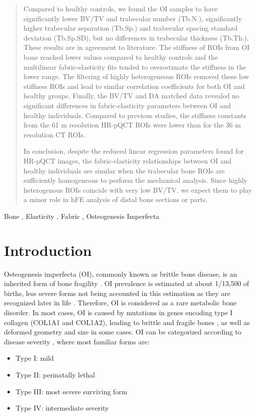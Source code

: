 \documentclass[a4paper,fleqn]{DC_ArtStyle}
\begin{document}
\begin{abstract}
	Compared to healthy controls, we found the OI samples to have significantly lower BV/TV and trabecular number (Tb.N.), significantly higher trabecular separation (Tb.Sp.) and trabecular spacing standard deviation (Tb.Sp.SD), but no differences in trabecular thickness (Tb.Th.). These results are in agreement to literature. The stiffness of ROIs from OI bone reached lower values compared to healthy controls and the multilinear fabric-elasticity fits tended to overestimate the stiffness in the lower range. The filtering of highly heterogeneous ROIs removed these low stiffness ROIs and lead to similar correlation coefficients for both OI and healthy groups. Finally, the BV/TV and DA matched data revealed no significant differences in fabric-elasticity parameters between OI and healthy individuals. Compared to previous studies, the stiffness constants from the 61 \si{\micro}m resolution HR-pQCT ROIs were lower than for the 36 \si{\micro}m resolution \si{\micro}CT ROIs.
	
	In conclusion, despite the reduced linear regression parameters found for HR-pQCT images, the fabric-elasticity relationships between OI and healthy individuals are similar when the trabecular bone ROIs are sufficiently homogeneous to perform the mechanical analysis. Since highly heterogenous ROIs coincide with very low BV/TV, we expect them to play a minor role in hFE analysis of distal bone sections or parts.
\end{abstract}

\begin{keywords}
Bone \sep
Elasticity \sep
Fabric \sep
Osteogenesis Imperfecta
\end{keywords}


\maketitle

\section{Introduction}

Osteogenesis imperfecta (OI), commonly known as brittle bone disease, is an inherited form of bone fragility \cite{Tournis2018}. OI prevalence is estimated at about  1/13,500 of births, less severe forms not being accounted in this estimation as they are recognized later in life \cite{Lindahl2015}. Therefore, OI is considered as a rare metabolic bone disorder. In most cases, OI is caused by mutations in genes encoding type I collagen (COL1A1 and COL1A2), leading to brittle and fragile bones \cite{LIM2017}, as well as deformed geometry and size in some cases. OI can be categorized according to disease severity \cite{Mortier2019}, where most familiar forms are:
\begin{itemize}
	\item Type I: mild
	\item Type II: perinatally lethal
	\item Type III: most severe surviving form
	\item Type IV: intermediate severity
\end{itemize}
\end{document}
